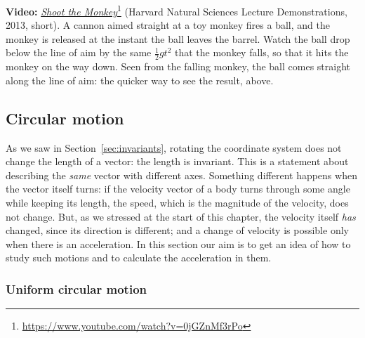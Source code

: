 \documentclass[11pt,a4paper]{article}
\begin{document}
\begin{aside}
\textbf{Video:}
\href{https://www.youtube.com/watch?v=0jGZnMf3rPo}{\emph{Shoot the
Monkey}}\footnote{\url{https://www.youtube.com/watch?v=0jGZnMf3rPo}} (Harvard Natural Sciences
Lecture Demonstrations, 2013, short). A cannon aimed straight at a toy monkey fires a ball, and the
monkey is released at the instant the ball leaves the barrel. Watch the ball drop below the line of
aim by the same $\frac12 gt^2$ that the monkey falls, so that it hits the monkey on the way down.
Seen from the falling monkey, the ball comes straight along the line of aim: the quicker way to see
the result, above.
\end{aside}

\subsection{Circular motion}\label{sec:circular}

As we saw in Section~\ref{sec:invariants}, rotating the coordinate system does not change the length
of a vector: the length is invariant. This is a statement about describing the \emph{same} vector
with different axes. Something different happens when the vector itself turns: if the velocity
vector of a body turns through some angle while keeping its length, the speed, which is the
magnitude of the velocity, does not change. But, as we stressed at the start of this chapter, the
velocity itself \emph{has} changed, since its direction is different; and a change of velocity is
possible only when there is an acceleration. In this section our aim is to get an idea of how to
study such motions and to calculate the acceleration in them.

\subsubsection{Uniform circular motion}\label{sec:ucm}
\end{document}
